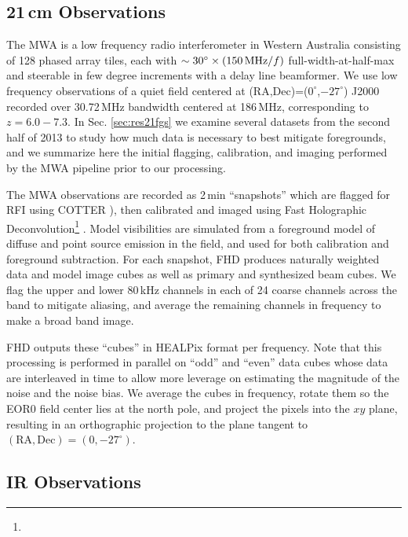 \documentclass{emulateapj}
\begin{document}
\subsection{21\,cm Observations}
\label{sec:mwaobservations}

The MWA is a low frequency radio interferometer in Western Australia consisting of 128 phased array tiles, each with $\sim30^\circ\times(150\text{\,MHz}/f)$ full-width-at-half-max and steerable in few degree increments with a delay line beamformer. We use low frequency observations of a quiet field centered at (RA,Dec)=($0^\circ$,$-27^\circ$) J2000 recorded over 30.72\,MHz bandwidth centered at 186\,MHz, corresponding to $z=6.0-7.3$. In Sec. \ref{sec:res21fgs} we examine several datasets from the second half of 2013 to study how much data is necessary to best mitigate foregrounds, and we summarize here the initial flagging, calibration, and imaging performed by the MWA pipeline prior to our processing. 

The MWA observations are recorded as 2\,min ``snapshots'' which are flagged for RFI using COTTER \citep{AndreMWARFI}), then calibrated and imaged using Fast Holographic Deconvolution\footnote{} \citep{fhd}. Model visibilities are simulated from a foreground model of diffuse \citep{beardsley16} and point source \citep{PattiCatalog1} emission in the field, and used for both calibration and foreground subtraction. For each snapshot, FHD produces naturally weighted data and model image cubes as well as primary and synthesized beam cubes. We flag the upper and lower 80\,kHz channels in each of 24 coarse channels across the band to mitigate aliasing, and average the remaining channels in frequency to make a broad band image. 

FHD outputs these ``cubes'' in HEALPix format per frequency. Note that this processing is performed in parallel on ``odd'' and ``even'' data cubes whose data are interleaved in time to allow more leverage on estimating the magnitude of the noise and the noise bias. We average the cubes in frequency, rotate them so the EOR0 field center lies at the north pole, and project the pixels into the $xy$ plane, resulting in an orthographic projection to the plane tangent to  $(\text{RA}, \text{Dec})=(0,-27^\circ)$.

\subsection{IR Observations}
\end{document}

